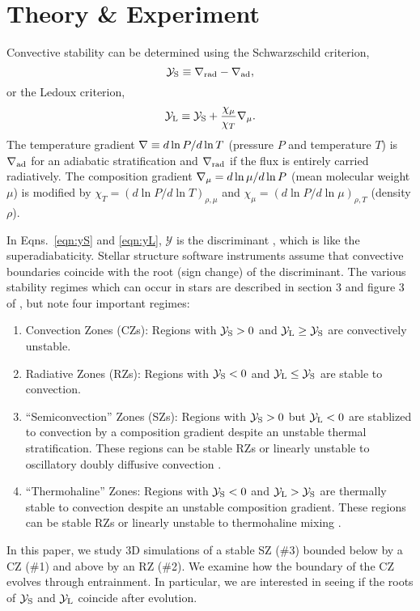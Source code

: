 \section{Theory \& Experiment}
\label{sec:theory}
Convective stability can be determined using the Schwarzschild criterion,
\begin{equation}
    \yS \equiv \gradrad - \gradad,
    \label{eqn:yS}
\end{equation}
or the Ledoux criterion,
\begin{equation}
    \yL \equiv \yS +  \frac{\chi_\mu}{\chi_T}\gradmu.
    \label{eqn:yL}
\end{equation}
The temperature gradient $\nabla \equiv d \ln P / d \ln T$ (pressure $P$ and temperature $T$) is $\nabla_{\rm{ad}}$ for an adiabatic stratification and $\nabla_{\rm{rad}}$ if the flux is entirely carried radiatively.
The composition gradient $\nabla_{\mu} = d\ln\mu/d\ln P$ (mean molecular weight $\mu$) is modified by $\chi_T = (d\ln P / d\ln T)_{\rho,\mu}$ and $\chi_\mu = (d\ln P / d\ln\mu)_{\rho,T}$ (density $\rho$).

In Eqns.~\ref{eqn:yS} and \ref{eqn:yL}, $\mathcal{Y}$ is the discriminant \citep[e.g.,][sec.~2]{mesa4}, which is like the superadiabaticity.
Stellar structure software instruments assume that convective boundaries coincide with the root (sign change) of the discriminant.
The various stability regimes which can occur in stars are described in section 3 and figure 3 of \citet{salaris_cassisi_2017}, but note four important regimes:
\begin{enumerate}
    \item Convection Zones (CZs): Regions with $\mathcal{Y}_{\rm{S}} > 0$ and $\mathcal{Y}_{\rm{L}} \geq \mathcal{Y}_{\rm{S}}$ are convectively unstable.
    \item Radiative Zones (RZs): Regions with $\mathcal{Y}_{\rm{S}} < 0$ and $\mathcal{Y}_{\rm{L}} \leq \mathcal{Y}_{\rm{S}}$ are stable to convection.
    \item ``Semiconvection'' Zones (SZs): Regions with $\mathcal{Y}_{\rm{S}} > 0$ but $\mathcal{Y}_{\rm{L}} < 0$ are stablized to convection by a composition gradient despite an unstable thermal stratification.
        These regions can be stable RZs or linearly unstable to oscillatory doubly diffusive convection \citep[ODDC, see][chapters 2 and 4]{garaud_2018}.
    \item ``Thermohaline'' Zones: Regions with $\mathcal{Y}_{\rm{S}} < 0$ and $\mathcal{Y}_{\rm{L}} > \mathcal{Y}_{\rm{S}}$ are thermally stable to convection despite an unstable composition gradient.
        These regions can be stable RZs or linearly unstable to thermohaline mixing \citep[see][chapters 2 and 3]{garaud_2018}.
\end{enumerate}
In this paper, we study 3D simulations of a stable SZ (\#3) bounded below by a CZ (\#1) and above by an RZ (\#2).
We examine how the boundary of the CZ evolves through entrainment.
In particular, we are interested in seeing if the roots of $\mathcal{Y}_{\rm{S}}$ and $\mathcal{Y}_{\rm{L}}$ coincide after evolution.

